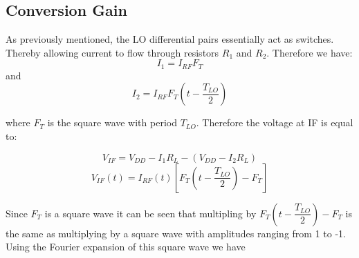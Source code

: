 \documentclass{article}                                                         %
\begin{document}
\subsection{Conversion Gain}
As previously mentioned, the LO differential pairs essentially act as switches. Thereby allowing current to flow through resistors $R_1$
and $R_2$. Therefore we have:
\begin{equation}
  \label{eq:I1}
  I_1 = I_{RF}F_{T}
\end{equation}
and
\begin{equation}
  \label{eq:I2}
  I_2 = I_{RF}F_{T}(t-\dfrac{T_{LO}}{2})
\end{equation}

where $F_{T}$ is the square wave with period $T_{LO}$. Therefore the voltage at IF is equal to:

\begin{equation}
  \label{eq:VIF}
  V_{IF} = V_{DD} - I_1R_L - (V_{DD}-I_2R_L)
\end{equation}
\begin{equation}
  \label{eq:VIFt}
  V_{IF}(t) = I_{RF}(t)[F_{T}(t-\dfrac{T_{LO}}{2})-F_{T}]
\end{equation}

\vspace{5mm}Since $F_T$ is a square wave it can be seen that multipling by $F_{T}(t-\dfrac{T_{LO}}{2})-F_{T}$
is the same as multiplying by a square wave with amplitudes ranging from 1 to -1. Using the Fourier
expansion of this square wave we have
\end{document}
